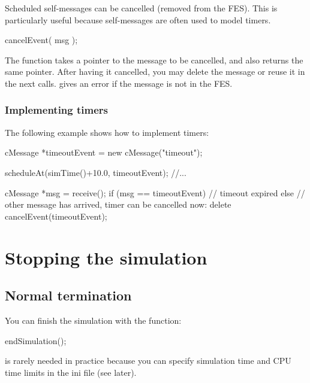 Scheduled self-messages can be cancelled
 (removed from the FES).
This is particularly useful because self-messages are often used
to model timers.

\begin{cpp}
cancelEvent( msg );
\end{cpp}

The  function takes a pointer to the message to
be cancelled, and also returns the same pointer. After having it
cancelled, you may delete the message or reuse it in the next
 calls.  gives an error if
the message is not in the FES.


\subsubsection{Implementing timers}

The following example shows how to implement timers:

\begin{cpp}
cMessage *timeoutEvent = new cMessage("timeout");

scheduleAt(simTime()+10.0, timeoutEvent);
//...

cMessage *msg = receive();
if (msg == timeoutEvent)
{
  // timeout expired
}
else
{
  // other message has arrived, timer can be cancelled now:
  delete cancelEvent(timeoutEvent);
}
\end{cpp}





\section{Stopping the simulation}
\label{sec:simple-modules:stopping}

\subsection{Normal termination}

You can finish the simulation with the  function:

\begin{cpp}
endSimulation();
\end{cpp}

 is rarely needed in practice because you
can specify simulation time and CPU time limits
in the ini file (see later).

